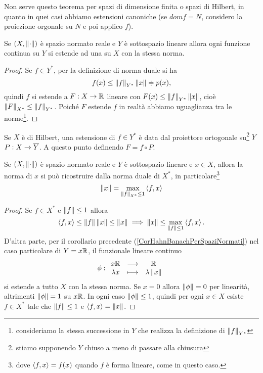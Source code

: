 \begin{remark}
Non serve questo teorema per spazi di dimensione finita o spazi di Hilbert, in quanto in quei casi abbiamo estensioni canoniche (se $dom f=N$, considero la proiezione orgonale su $N$ e poi applico $f$).
\end{remark}

\begin{corollary}\label{CorHahnBanachPerSpaziNormati}
Se $(X,\left\Vert{\cdot}\right\Vert)$ \`e spazio normato reale e $Y$ \`e sottospazio lineare allora ogni funzione continua su $Y$ si estende ad una su $X$ con la stessa norma.
\end{corollary}
\begin{proof}
Se $f\in Y^\ast$, per la definizione di norma duale si ha 
\[f(x)\leq \left\Vert{f}\right\Vert_{Y^\ast}\left\Vert{x}\right\Vert\doteqdot p(x),\]
quindi $f$ si estende a $F:X\to \mathbb{R}$ lineare con $F(x)\leq \left\Vert{f}\right\Vert_{Y^\ast}\left\Vert{x}\right\Vert$, cio\`e $\left\Vert{F}\right\Vert_{X^\ast}\leq \left\Vert{f}\right\Vert_{Y^\ast}$. Poich\'e $F$ estende $f$ in realt\`a abbiamo uguaglianza tra le norme\footnote{consideriamo la stessa successione in $Y$ che realizza la definizione di $\left\Vert{f}\right\Vert_{Y^\ast}$}.
\end{proof}

\begin{remark}
Se $X$ \`e di Hilbert, una estensione di $f\in Y^\ast$ \`e data dal proiettore ortogonale su\footnote{stiamo supponendo $Y$ chiuso a meno di passare alla chiusura} $Y$ $P:X\to \overline{Y}$. A questo punto definendo $F=f\circ P$.
\end{remark}

\begin{corollary}\label{CorRicostruireNormaTramiteFunzionali}
Se $(X,\left\Vert{\cdot}\right\Vert)$ \`e spazio normato reale e $Y$ \`e sottospazio lineare e $x\in X$, allora la norma di $x$ si pu\`o ricostruire dalla norma duale di $X^\ast$, in particolare\footnote{dove $\left\langle {f,x}\right\rangle=f(x)$ quando $f$ \`e forma lineare, come in questo caso.}
\[\left\Vert{x}\right\Vert=\max_{\left\Vert{f}\right\Vert_{X^\ast}\leq1}\left\langle {f,x}\right\rangle\]
\end{corollary}
\begin{proof}
Se $f\in X^\ast$ e $\left\Vert{f}\right\Vert\leq 1$ allora
\[\left\langle {f,x}\right\rangle\leq \left\Vert{f}\right\Vert\left\Vert{x}\right\Vert\leq \left\Vert{x}\right\Vert\implies \left\Vert{x}\right\Vert\leq \max_{\left\Vert{f}\right\Vert\leq 1}\left\langle {f,x}\right\rangle.\]
D'altra parte, per il corollario precedente (\ref{CorHahnBanachPerSpaziNormati}) nel caso particolare di $Y=x\mathbb{R}$, il funzionale lineare continuo \[\phi:\begin{array}{ccc} {x\mathbb{R}} & \longrightarrow & {\mathbb{R}}\\ {\lambda x} & \longmapsto & {\lambda\left\Vert{x}\right\Vert} \end{array}\]
si estende a tutto $X$ con la stessa norma. Se $x=0$ allora $\left\Vert{\phi}\right\Vert=0$ per linearit\`a, altrimenti $\left\Vert{\phi}\right\Vert=1$ su $x\mathbb{R}$. In ogni caso $\left\Vert{\phi}\right\Vert\leq 1$, quindi per ogni $x\in X$ esiste $f\in X^\ast$ tale che $\left\Vert{f}\right\Vert\leq 1$ e $\left\langle {f,x}\right\rangle=\left\Vert{x}\right\Vert$.
\end{proof}

